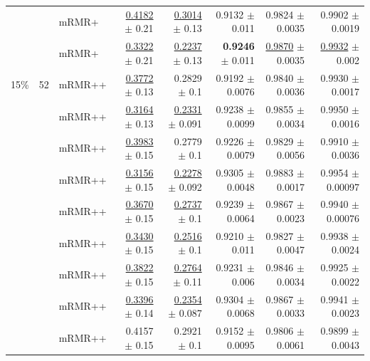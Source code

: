 \begin{longtable}{llp{}rrrrr}
 &  & mRMR+ & \underline{0.4182} {\scriptsize $\pm$ 0.21} & \underline{0.3014} {\scriptsize $\pm$ 0.13} & 0.9132 {\scriptsize $\pm$ 0.011} & 0.9824 {\scriptsize $\pm$ 0.0035} & 0.9902 {\scriptsize $\pm$ 0.0019} \\
 &  & mRMR+ & \underline{0.3322} {\scriptsize $\pm$ 0.21} & \underline{0.2237} {\scriptsize $\pm$ 0.13} & \textbf{0.9246} {\scriptsize $\pm$ 0.011} & \underline{0.9870} {\scriptsize $\pm$ 0.0035} & \underline{0.9932} {\scriptsize $\pm$ 0.002} \\
\midrule
15\% & 52 & mRMR++ & \underline{0.3772} {\scriptsize $\pm$ 0.13} & 0.2829 {\scriptsize $\pm$ 0.1} & 0.9192 {\scriptsize $\pm$ 0.0076} & 0.9840 {\scriptsize $\pm$ 0.0036} & 0.9930 {\scriptsize $\pm$ 0.0017} \\
 &  & mRMR++ & \underline{0.3164} {\scriptsize $\pm$ 0.13} & \underline{0.2331} {\scriptsize $\pm$ 0.091} & 0.9238 {\scriptsize $\pm$ 0.0099} & 0.9855 {\scriptsize $\pm$ 0.0034} & 0.9950 {\scriptsize $\pm$ 0.0016} \\
 &  & mRMR++ & \underline{0.3983} {\scriptsize $\pm$ 0.15} & 0.2779 {\scriptsize $\pm$ 0.1} & 0.9226 {\scriptsize $\pm$ 0.0079} & 0.9829 {\scriptsize $\pm$ 0.0056} & 0.9910 {\scriptsize $\pm$ 0.0036} \\
 &  & mRMR++ & \underline{0.3156} {\scriptsize $\pm$ 0.15} & \underline{0.2278} {\scriptsize $\pm$ 0.092} & 0.9305 {\scriptsize $\pm$ 0.0048} & 0.9883 {\scriptsize $\pm$ 0.0017} & 0.9954 {\scriptsize $\pm$ 0.00097} \\
 &  & mRMR++ & \underline{0.3670} {\scriptsize $\pm$ 0.15} & \underline{0.2737} {\scriptsize $\pm$ 0.1} & 0.9239 {\scriptsize $\pm$ 0.0064} & 0.9867 {\scriptsize $\pm$ 0.0023} & 0.9940 {\scriptsize $\pm$ 0.00076} \\
 &  & mRMR++ & \underline{0.3430} {\scriptsize $\pm$ 0.15} & \underline{0.2516} {\scriptsize $\pm$ 0.1} & 0.9210 {\scriptsize $\pm$ 0.011} & 0.9827 {\scriptsize $\pm$ 0.0047} & 0.9938 {\scriptsize $\pm$ 0.0024} \\
 &  & mRMR++ & \underline{0.3822} {\scriptsize $\pm$ 0.15} & \underline{0.2764} {\scriptsize $\pm$ 0.11} & 0.9231 {\scriptsize $\pm$ 0.006} & 0.9846 {\scriptsize $\pm$ 0.0034} & 0.9925 {\scriptsize $\pm$ 0.0022} \\
 &  & mRMR++ & \underline{0.3396} {\scriptsize $\pm$ 0.14} & \underline{0.2354} {\scriptsize $\pm$ 0.087} & 0.9304 {\scriptsize $\pm$ 0.0068} & 0.9867 {\scriptsize $\pm$ 0.0033} & 0.9941 {\scriptsize $\pm$ 0.0023} \\
 &  & mRMR++ & 0.4157 {\scriptsize $\pm$ 0.15} & 0.2921 {\scriptsize $\pm$ 0.1} & 0.9152 {\scriptsize $\pm$ 0.0095} & 0.9806 {\scriptsize $\pm$ 0.0061} & 0.9899 {\scriptsize $\pm$ 0.0043} \\

\end{longtable}
